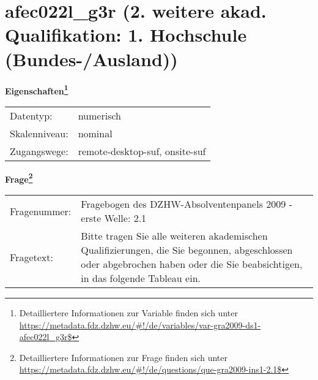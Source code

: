 
    \setcounter{footnote}{0}

    \vspace*{-1.8cm}
	\section{afec022l\_g3r (2. weitere akad. Qualifikation: 1. Hochschule (Bundes-/Ausland))}
	\label{section:afec022l_g3r}



    \vspace*{0.5cm}
    \noindent\textbf{Eigenschaften\footnote{Detailliertere Informationen zur Variable finden sich unter
		\url{https://metadata.fdz.dzhw.eu/\#!/de/variables/var-gra2009-ds1-afec022l_g3r$}}}\\
	\begin{tabularx}{\hsize}{@{}lX}
	Datentyp: & numerisch \\
	Skalenniveau: & nominal \\
	Zugangswege: &
	  remote-desktop-suf, 
	  onsite-suf
 \\
    \end{tabularx}



				\vspace*{0.5cm}
                \noindent\textbf{Frage\footnote{Detailliertere Informationen zur Frage finden sich unter
		              \url{https://metadata.fdz.dzhw.eu/\#!/de/questions/que-gra2009-ins1-2.1$}}}\\
				\begin{tabularx}{\hsize}{@{}lX}
					Fragenummer: &
					  Fragebogen des DZHW-Absolventenpanels 2009 - erste Welle:
					  2.1
 \\
					Fragetext: & Bitte tragen Sie alle weiteren akademischen Qualifizierungen, die Sie begonnen, abgeschlossen oder abgebrochen haben oder die Sie beabsichtigen, in das folgende Tableau ein. \\
				\end{tabularx}





